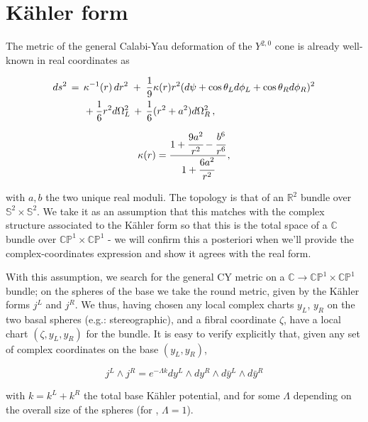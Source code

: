 \section{K\"ahler form}

The metric of the general Calabi-Yau deformation of the $Y^{2,0}$ cone is already well-known in real coordinates as

\begin{align}
\begin{split}
ds^2 \,= \;\, &\kappa^{-1}(r)\,dr^2 \;+\; \frac{1}{9} \kappa(r) r^2 \large(d\psi + \cos\theta_L d\phi_L + \cos\theta_R d\phi_R\large)^2\\
& + \frac{1}{6} r^2 d\Omega_L^2 \,+ \, \frac{1}{6}(r^2+a^2) d\Omega_R^2\,, \label{y20metric} 
\end{split}
\end{align}

\begin{equation}
	\kappa(r) = \cfrac{1 + \cfrac{9a^2}{r^2} - \cfrac{b^6}{r^6}}{1+ \cfrac{6a^2}{r^2}}\,,
\end{equation}

with $a,b$ the two unique real moduli. The topology is that of an $\mathbb{R}^2$ bundle over $\mathbb{S}^2 \times \mathbb{S}^2$. We take it as an assumption that this matches with the complex structure associated to the K\"ahler form so that this is the total space of a $\mathbb{C}$ bundle over $\mathbb{CP}^1 \times \mathbb{CP}^1$ - we will confirm this a posteriori when we'll provide the complex-coordinates expression and show it agrees with the real form.

With this assumption, we search for the general CY metric on a $\mathbb{C} \rightarrow \mathbb{CP}^1 \times \mathbb{CP}^1$ bundle; on the spheres of the base we take the round metric, given by the K\"ahler forms $j^L$ and $j^R$. We thus, having chosen any local complex charts $y_L$, $y_R$ on the two basal spheres (e.g.: stereographic), and a fibral coordinate $\zeta$, have a local chart $(\zeta,y_L,y_R)$ for the bundle. It is easy to verify explicitly that, given any set of complex coordinates on the base $(y_L,y_R)$,

\begin{equation}
	j^L \wedge j^R = e^{-\Lambda k} dy^L \wedge dy^R \wedge d\bar y^L \wedge d\bar y^R
\end{equation}

with $k = k^L + k^R$ the total base K\"ahler potential, and for some $\Lambda$ depending on the overall size of the spheres (for , $\Lambda = 1$).


